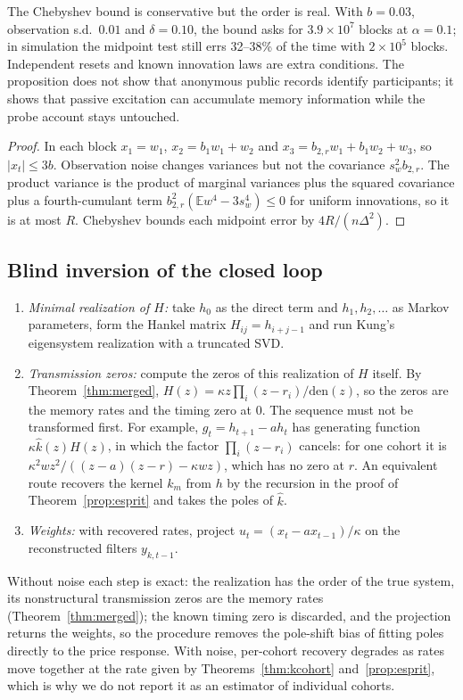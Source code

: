 \documentclass[12pt]{article}
\theoremstyle{definition}
\theoremstyle{remark}
\newcommand{\E}{\mathbb{E}}
\begin{document}
The Chebyshev bound is conservative but the order is real. With $b=0.03$, observation s.d.\ $0.01$ and $\delta=0.10$, the bound asks for $3.9\times10^7$ blocks at $\alpha=0.1$; in simulation the midpoint test still errs 32--38\% of the time with $2\times10^5$ blocks. Independent resets and known innovation laws are extra conditions. The proposition does not show that anonymous public records identify participants; it shows that passive excitation can accumulate memory information while the probe account stays untouched.

\begin{proof} In each block $x_1=w_1$, $x_2=b_1w_1+w_2$ and $x_3=b_{2,r}w_1+b_1w_2+w_3$, so $|x_t|\le3b$. Observation noise changes variances but not the covariance $s_w^2b_{2,r}$. The product variance is the product of marginal variances plus the squared covariance plus a fourth-cumulant term $b_{2,r}^2(\E w^4-3s_w^4)\le0$ for uniform innovations, so it is at most $R$. Chebyshev bounds each midpoint error by $4R/(n\Delta^2)$.
\end{proof}

\subsection{Blind inversion of the closed loop}\label{app:era}
\begin{enumerate}[itemsep=1pt]
\item \emph{Minimal realization of $H$:} take $h_0$ as the direct term and $h_1,h_2,\ldots$ as Markov parameters, form the Hankel matrix $H_{ij}=h_{i+j-1}$ and run Kung's eigensystem realization with a truncated SVD.
\item \emph{Transmission zeros:} compute the zeros of this realization of $H$ itself. By Theorem~\ref{thm:merged}, $H(z)=\kappa z\prod_i(z-r_i)/\mathrm{den}(z)$, so the zeros are the memory rates and the timing zero at $0$. The sequence must not be transformed first. For example, $g_t=h_{t+1}-ah_t$ has generating function $\kappa\hat k(z)H(z)$, in which the factor $\prod_i(z-r_i)$ cancels: for one cohort it is $\kappa^2wz^2/((z-a)(z-r)-\kappa wz)$, which has no zero at $r$. An equivalent route recovers the kernel $k_m$ from $h$ by the recursion in the proof of Theorem~\ref{prop:esprit} and takes the poles of $\hat k$.
\item \emph{Weights:} with recovered rates, project $u_t=(x_t-ax_{t-1})/\kappa$ on the reconstructed filters $y_{k,t-1}$.
\end{enumerate}
Without noise each step is exact: the realization has the order of the true system, its nonstructural transmission zeros are the memory rates (Theorem~\ref{thm:merged}); the known timing zero is discarded, and the projection returns the weights, so the procedure removes the pole-shift bias of fitting poles directly to the price response. With noise, per-cohort recovery degrades as rates move together at the rate given by Theorems~\ref{thm:kcohort} and~\ref{prop:esprit}, which is why we do not report it as an estimator of individual cohorts.
\end{document}
